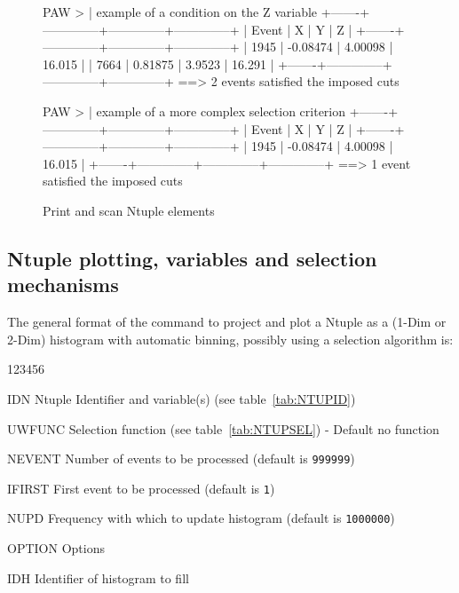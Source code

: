 \begin{figure}
\begin{salltt}
 PAW >                             | example of a condition on the Z variable
+-------+--------------+--------------+--------------+
| Event |   X          |   Y          |   Z          |
+-------+--------------+--------------+--------------+
|  1945 | -0.08474     |  4.00098     |  16.015      |
|  7664 |  0.81875     |  3.9523      |  16.291      |
+-------+--------------+--------------+--------------+
==> 2 events satisfied the imposed cuts
 
 PAW >             | example of a more complex selection criterion
+-------+--------------+--------------+--------------+
| Event |   X          |   Y          |   Z          |
+-------+--------------+--------------+--------------+
|  1945 | -0.08474     |  4.00098     |  16.015      |
+-------+--------------+--------------+--------------+
==> 1 event satisfied the imposed cuts
\end{salltt}

\caption{Print and scan Ntuple elements}
\label{fig:NTPRINT}
\end{figure}

\subsection{Ntuple plotting, variables and selection mechanisms}

The general format of the command  to
project and plot a Ntuple as a (1-Dim or 2-Dim) histogram
with automatic binning, possibly using a selection algorithm is:


\begin{DLtt}{123456}
\item[IDN]    Ntuple Identifier and variable(s) 
              (see table~\ref{tab:NTUPID})
\item[UWFUNC] Selection function 
              (see table~\ref{tab:NTUPSEL}) - Default no function
\item[NEVENT] Number of events to be processed (default is \texttt{999999})
\item[IFIRST] First event to be processed (default is \texttt{1})
\item[NUPD]   Frequency with which to update histogram 
              (default is \texttt{1000000})
\item[OPTION] Options
\item[IDH]    Identifier of histogram to fill
\end{DLtt}

